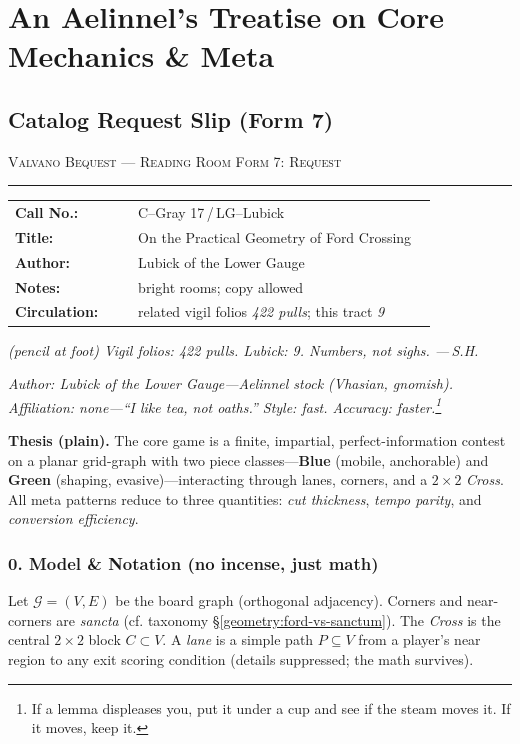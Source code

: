 \documentclass[11pt]{article}
\numberwithin{equation}{section} %
\theoremstyle{plain} %
\theoremstyle{definition} %
\theoremstyle{remark} %
\begin{document}
\clearpage
\section{An Aelinnel’s Treatise on Core Mechanics \& Meta}
\label{geometry:aelinnel-core}

\subsection*{Catalog Request Slip (Form 7)}

\small
\noindent\textsc{Valvano Bequest — Reading Room} \hfill \textsc{Form 7: Request}\\[-2pt]
\hrule height 0.4pt
\medskip
\begin{tabular}{@{}p{0.28\linewidth}p{0.68\linewidth}@{}}
\textbf{Call No.:} & C--Gray 17\,/\,LG--Lubick \\
\textbf{Title:} & On the Practical Geometry of Ford Crossing \\
\textbf{Author:} & Lubick of the Lower Gauge \\
\textbf{Notes:} & bright rooms; copy allowed \\
\textbf{Circulation:} & related vigil folios \textit{422 pulls}; this tract \textit{9} \\
\end{tabular}

\medskip
\noindent\footnotesize\itshape
(pencil at foot) Vigil folios: 422 pulls. Lubick: 9. Numbers, not sighs. —\,S.H.
\normalsize

\medskip
\noindent\textit{Author: Lubick of the Lower Gauge---Aelinnel stock (Vhasian, gnomish). Affiliation: none---``I like tea, not oaths.'' Style: fast. Accuracy: faster.\footnote{If a lemma displeases you, put it under a cup and see if the steam moves it. If it moves, keep it.}}

\medskip
\noindent\textbf{Thesis (plain).} The core game is a finite, impartial, perfect-information contest on a planar grid-graph with two piece classes---\textbf{Blue} (mobile, anchorable) and \textbf{Green} (shaping, evasive)---interacting through lanes, corners, and a \(2\times 2\) \emph{Cross}. All meta patterns reduce to three quantities: \emph{cut thickness}, \emph{tempo parity}, and \emph{conversion efficiency}.

\subsubsection{0. Model \& Notation (no incense, just math)}
Let \(\mathcal{G}=(V,E)\) be the board graph (orthogonal adjacency). Corners and near-corners are \emph{sancta} (cf. taxonomy \S\ref{geometry:ford-vs-sanctum}). The \emph{Cross} is the central \(2\times 2\) block \(C\subset V\). A \emph{lane} is a simple path \(P\subseteq V\) from a player's near region to any exit scoring condition (details suppressed; the math survives).
\end{document}
